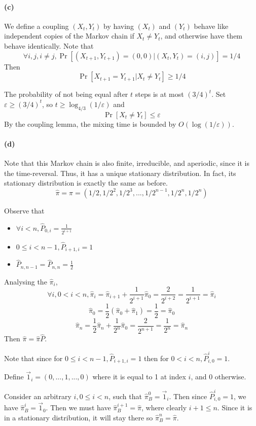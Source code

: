 \documentclass[11pt]{article} %
\begin{document}
\paragraph{(c)}
We define a coupling $(X_t,Y_t)$ by having $(X_t)$ and $(Y_t)$ behave like independent copies 
of the Markov chain if $X_t\neq Y_t$, and otherwise have them behave identically.
Note that
\[\forall i,j,i\neq j, \Pr[(X_{t+1},Y_{t+1})=(0,0)|(X_t,Y_t)=(i,j)] = 1/4\]
Then
\[\Pr[X_{t+1}=Y_{t+1}|X_t\neq Y_t] \geq 1/4\]

The probability of not being equal after $t$ steps is at most $(3/4)^t$.
Set $\varepsilon\geq(3/4)^t$, so $t\geq\log_{4/3}(1/\varepsilon)$ and
\[\Pr[X_t\neq Y_t]\leq \varepsilon\]
By the coupling lemma, the mixing time is bounded by $O(\log(1/\varepsilon))$.

\clearpage
\paragraph{(d)}
Note that this Markov chain is also finite, irreducible, and aperiodic, since it is the time-reversal.
Thus, it has a unique stationary distribution.
In fact, its stationary distribution is exactly the same as before.
\[\hat{\pi}=\pi=(1/2,1/2^2,1/2^3,...,1/2^{n-1},1/2^n,1/2^n)\]

Observe that 
\begin{itemize}
    \item $\forall i<n, \hat{P}_{0,i}=\frac{1}{2^{i+1}}$
    \item $0\leq i < n-1,\hat{P}_{i+1,i}=1$
    \item $\hat{P}_{n,n-1}=\hat{P}_{n,n}=\frac{1}{2}$ 
\end{itemize}

Analysing the $\hat{\pi}_i$,
\[\forall i, 0<i<n, \hat{\pi}_i = \hat{\pi}_{i+1} + \frac{1}{2^{i+1}}\hat{\pi}_0
=\frac{2}{2^{i+2}}=\frac{1}{2^{i+1}}=\hat{\pi}_i\]
\[\hat{\pi}_0 = \frac{1}{2}(\hat{\pi}_0+\hat{\pi}_1)=\frac{1}{2}=\hat{\pi}_0\]
\[\hat{\pi}_n = \frac{1}{2}\hat{\pi}_n + \frac{1}{2^n}\hat{\pi}_0 
=\frac{2}{2^{n+1}}=\frac{1}{2^n}=\hat{\pi}_n\]
Then $\hat{\pi}=\hat{\pi}\hat{P}$.

Note that since for $0\leq i<n-1, \hat{P}_{i+1,i}=1$ then for $0<i<n, \hat{P}_{i,0}^i=1$.

Define $\vec{1}_i= (0,...,1,...,0)$ where it is equal to 1 at index $i$, and 0 otherwise.

Consider an arbitrary $i, 0\leq i<n$, such that $\hat{\pi}_B^0=\vec{1}_i$.
Then since $\hat{P}_{i,0}^i=1$, we have $\hat{\pi}_B^i=\vec{1}_0$. 
Then we must have $\hat{\pi}_B^{i+1}=\hat{\pi}$, where clearly $i+1\leq n$.
Since it is in a stationary distribution, it will stay there so $\hat{\pi}_B^{n}=\hat{\pi}$.
\end{document}
